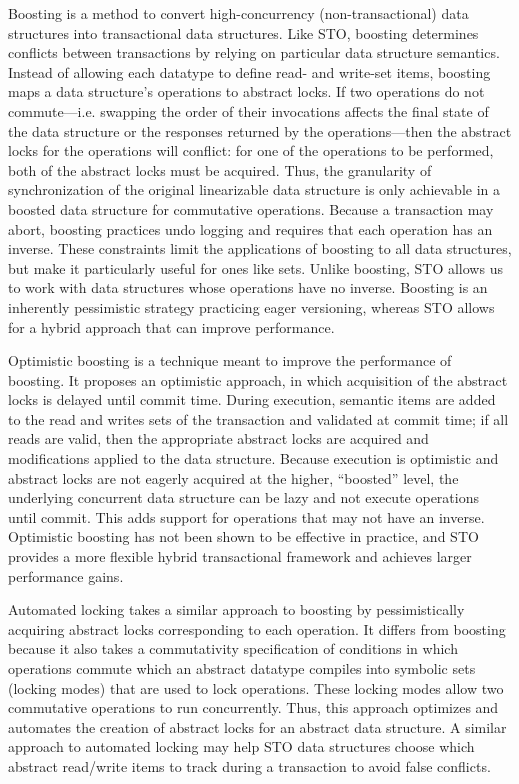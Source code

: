 Boosting\cite{boost} is a method to convert high-concurrency (non-transactional) data structures into transactional data structures. Like STO, boosting determines conflicts between transactions by relying on particular data structure semantics. Instead of allowing each datatype to define read- and write-set items, boosting maps a data structure's operations to abstract locks. If two operations do not commute---i.e. swapping the order of their invocations affects the final state of the data structure or the responses returned by the operations---then the abstract locks for the operations will conflict: for one of the operations to be performed, both of the abstract locks must be acquired. Thus, the granularity of synchronization of the original linearizable data structure is only achievable in a boosted data structure for commutative operations. Because a transaction may abort, boosting practices undo logging and requires that each operation has an inverse. These constraints limit the applications of boosting to all data structures, but make it particularly useful for ones like sets. Unlike boosting, STO allows us to work with data structures whose operations have no inverse. Boosting is an inherently pessimistic strategy practicing eager versioning, whereas STO allows for a hybrid approach that can improve performance.

Optimistic boosting\cite{optboost} is a technique meant to improve the performance of boosting. It proposes an optimistic approach, in which acquisition of the abstract locks is delayed until commit time. During execution, semantic items are added to the read and writes sets of the transaction and validated at commit time; if all reads are valid, then the appropriate abstract locks are acquired and modifications applied to the data structure. Because execution is optimistic and abstract locks are not eagerly acquired at the higher, ``boosted'' level, the underlying concurrent data structure can be lazy and not execute operations until commit. This adds support for operations that may not have an inverse. 
Optimistic boosting has not been shown to be effective in practice, and STO provides a more flexible hybrid transactional framework and achieves larger performance gains.

Automated locking\cite{autolock} takes a similar approach to boosting by pessimistically acquiring abstract locks corresponding to each operation. It differs from boosting because it also takes a commutativity specification of conditions in which operations commute which an abstract datatype compiles into symbolic sets (locking modes) that are used to lock operations. These locking modes allow two commutative operations to run concurrently. Thus, this approach optimizes and automates the creation of abstract locks for an abstract data structure. A similar approach to automated locking may help STO data structures choose which abstract read/write items to track during a transaction to avoid false conflicts.

